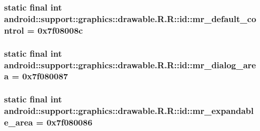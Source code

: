 \hypertarget{classandroid_1_1support_1_1graphics_1_1drawable_1_1_r_1_1id_dbf4a0f605692a7ca11e0a5dcc263946}{
\subsubsection[{mr\_\-default\_\-control}]{\setlength{\rightskip}{0pt plus 5cm}static final int android::support::graphics::drawable.R.R::id::mr\_\-default\_\-control = 0x7f08008c}}
\label{classandroid_1_1support_1_1graphics_1_1drawable_1_1_r_1_1id_dbf4a0f605692a7ca11e0a5dcc263946}


\hypertarget{classandroid_1_1support_1_1graphics_1_1drawable_1_1_r_1_1id_c086f96063efac0f7daf85971fcd07f6}{
\subsubsection[{mr\_\-dialog\_\-area}]{\setlength{\rightskip}{0pt plus 5cm}static final int android::support::graphics::drawable.R.R::id::mr\_\-dialog\_\-area = 0x7f080087}}
\label{classandroid_1_1support_1_1graphics_1_1drawable_1_1_r_1_1id_c086f96063efac0f7daf85971fcd07f6}


\hypertarget{classandroid_1_1support_1_1graphics_1_1drawable_1_1_r_1_1id_c8c6d6f8ad5d6ae65ef01369ca169afd}{
\subsubsection[{mr\_\-expandable\_\-area}]{\setlength{\rightskip}{0pt plus 5cm}static final int android::support::graphics::drawable.R.R::id::mr\_\-expandable\_\-area = 0x7f080086}}
\label{classandroid_1_1support_1_1graphics_1_1drawable_1_1_r_1_1id_c8c6d6f8ad5d6ae65ef01369ca169afd}


